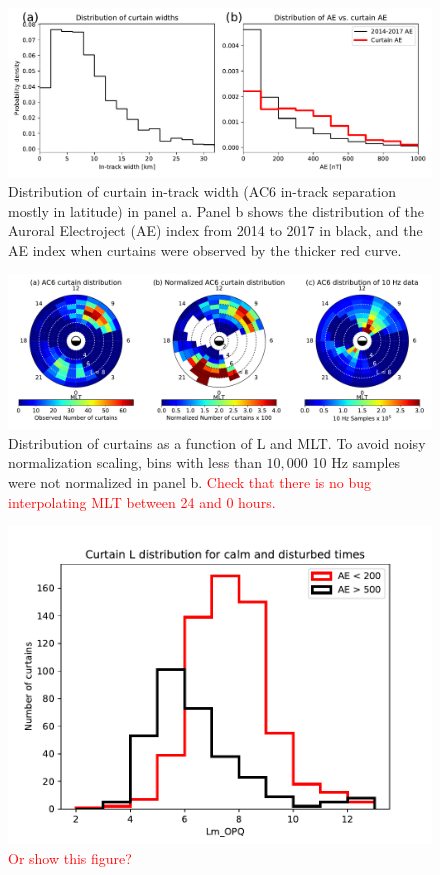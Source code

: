 \documentclass[draft]{agujournal2019}
\begin{document}
\begin{figure}
\includegraphics[width=\textwidth]{ac6_curtains_ae_width_dist.pdf}
\caption{Distribution of curtain in-track width (AC6 in-track separation mostly in latitude) in panel a. Panel b shows the distribution of the Auroral Electroject (AE) index from 2014 to 2017 in black, and the AE index when curtains were observed by the thicker red curve.}
\label{ae_width_dist}
\end{figure}

\begin{figure}
\includegraphics[width=\textwidth]{fig2.pdf}
\caption{Distribution of curtains as a function of L and MLT. To avoid noisy normalization scaling, bins with less than $10,000$ 10 Hz samples were not normalized in panel b. \textcolor{red}{Check that there is no bug interpolating MLT between 24 and 0 hours.}}
\label{fig2}
\end{figure}

\begin{figure}
\includegraphics[width=\textwidth]{curtain_L_vs_AE.pdf}
\caption{\textcolor{red}{Or show this figure?}}
\end{figure}
\end{document}
